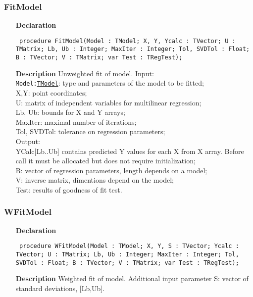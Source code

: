 \documentclass[12pt,a4paper,oneside]{report}
\newcommand{\declarationitem}[1]{\textbf{#1}}
\newcommand{\descriptiontitle}[1]{\textbf{#1}}
\newcommand{\code}[1]{\texttt{#1}}
\begin{document}
\subsubsection{FitModel}
\label{umodels-FitModel}
\begin{itemize}\item[\declarationitem{Declaration}\hfill]
	\begin{flushleft}
		\code{
			procedure FitModel(Model : TModel; X, Y, Ycalc : TVector; U : TMatrix; Lb, Ub : Integer; MaxIter : Integer; Tol, SVDTol : Float; B : TVector; V : TMatrix; var Test : TRegTest);}
		
	\end{flushleft}
	
	\par
	\item[\descriptiontitle{Description}]
	Unweighted fit of model. 
	Input:\\
	\code{Model:\hyperref[umodels-TModel]{TModel}}: type and parameters of the model to be fitted;\\
	X,Y: point coordinates;\\
	U: matrix of independent variables for multilinear regression;\\
	Lb, Ub: bounds for X and Y arrays;\\
	MaxIter: maximal number of iterations;\\
	Tol, SVDTol: tolerance on regression parameters;\\
	
	Output:\\ YCalc[Lb..Ub] contains predicted Y values for each X from X array. Before call it must be allocated but does not require initialization;\\
	B: vector of regression parameters, length depends on a model;\\
	V: inverse matrix, dimentions depend on the model;\\
	Test: results of goodness of fit test.
	
\end{itemize}
\subsubsection{WFitModel}
\label{umodels-WFitModel}
\begin{itemize}\item[\declarationitem{Declaration}\hfill]
	\begin{flushleft}
		\code{
			procedure WFitModel(Model : TModel; X, Y, S : TVector; Ycalc : TVector; U : TMatrix; Lb, Ub : Integer; MaxIter : Integer; Tol, SVDTol : Float; B : TVector; V : TMatrix; var Test : TRegTest);}
		
	\end{flushleft}
	
	\par
	\item[\descriptiontitle{Description}]
	Weighted fit of model. Additional input parameter S: vector of standard deviations, [Lb,Ub]. 	
\end{itemize}
\end{document}

